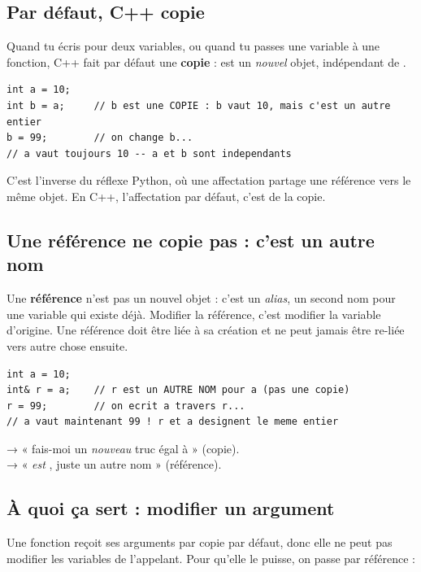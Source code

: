 \documentclass[11pt]{article}
\begin{document}
\subsection*{Par défaut, C++ copie}

Quand tu écris  pour deux variables, ou quand tu passes une variable
à une fonction, C++ fait par défaut une \textbf{copie} :  est un
\emph{nouvel} objet, indépendant de .

\begin{lstlisting}
int a = 10;
int b = a;     // b est une COPIE : b vaut 10, mais c'est un autre entier
b = 99;        // on change b...
// a vaut toujours 10 -- a et b sont independants
\end{lstlisting}

C'est l'inverse du réflexe Python, où une affectation partage une référence vers
le même objet. En C++, l'affectation par défaut, c'est de la copie.

\subsection*{Une référence ne copie pas : c'est un autre nom}

Une \textbf{référence}  n'est pas un nouvel objet : c'est un
\emph{alias}, un second nom pour une variable qui existe déjà. Modifier la
référence, c'est modifier la variable d'origine. Une référence doit être liée à
sa création et ne peut jamais être re-liée vers autre chose ensuite.

\begin{lstlisting}
int a = 10;
int& r = a;    // r est un AUTRE NOM pour a (pas une copie)
r = 99;        // on ecrit a travers r...
// a vaut maintenant 99 ! r et a designent le meme entier
\end{lstlisting}

\begin{aretenir}
 → « fais-moi un \emph{nouveau} truc égal à  » (copie).\\
 → «  \emph{est} , juste un autre nom »
(référence).
\end{aretenir}

\subsection*{À quoi ça sert : modifier un argument}

Une fonction reçoit ses arguments par copie par défaut, donc elle ne peut pas
modifier les variables de l'appelant. Pour qu'elle le puisse, on passe par
référence :
\end{document}
